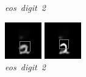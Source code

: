 \documentclass{article} %
\begin{document}
\begin{figure}[t]
  \caption{\mbox{\textit{eos digit 2}}}
\endminipage\hfill
{}
  \includegraphics[width=\linewidth]{figures/9-2-9.png}
  \caption{\mbox{\textit{eos digit 2}}}
\endminipage\hfill
{}
  \includegraphics[width=\linewidth]{figures/9-2-13.png}

\end{figure}
\end{document}
